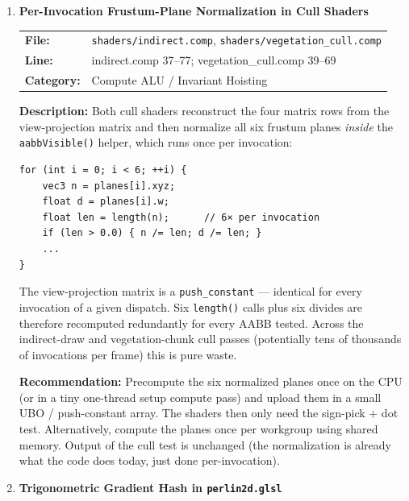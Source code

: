 \documentclass[a4paper,12pt]{article}
\newcommand{\severitybox}[2]{%
  \colorbox{#1}{\makebox[2.5cm][c]{\textcolor{white}{\textbf{#2}}}}%
}
\begin{document}
\begin{enumerate}[leftmargin=*]
\subsection{Medium Severity}

\item[\textbf{[C2]}] \textbf{Per-Invocation Frustum-Plane Normalization in Cull Shaders}
  \hfill \severitybox{mediumcolor}{MEDIUM}

  \begin{tabular}{ll}
    \textbf{File:} & \texttt{shaders/indirect.comp}, \texttt{shaders/vegetation\_cull.comp} \\
    \textbf{Line:} & indirect.comp 37--77; vegetation\_cull.comp 39--69 \\
    \textbf{Category:} & Compute ALU / Invariant Hoisting \\
  \end{tabular}

  \textbf{Description:}
  Both cull shaders reconstruct the four matrix rows from the view-projection
  matrix and then normalize all six frustum planes \emph{inside} the
  \texttt{aabbVisible()} helper, which runs once per invocation:

\begin{lstlisting}
for (int i = 0; i < 6; ++i) {
    vec3 n = planes[i].xyz;
    float d = planes[i].w;
    float len = length(n);      // 6× per invocation
    if (len > 0.0) { n /= len; d /= len; }
    ...
}
\end{lstlisting}

  The view-projection matrix is a \texttt{push\_constant} — identical for every
  invocation of a given dispatch. Six \texttt{length()} calls plus six divides
  are therefore recomputed redundantly for every AABB tested. Across the
  indirect-draw and vegetation-chunk cull passes (potentially tens of thousands
  of invocations per frame) this is pure waste.

  \textbf{Recommendation:}
  Precompute the six normalized planes once on the CPU (or in a tiny one-thread
  setup compute pass) and upload them in a small UBO / push-constant array. The
  shaders then only need the sign-pick + dot test. Alternatively, compute the
  planes once per workgroup using shared memory. Output of the cull test is
  unchanged (the normalization is already what the code does today, just done
  per-invocation).

\item[\textbf{[NL1]}] \textbf{Trigonometric Gradient Hash in \texttt{perlin2d.glsl}}
  \hfill \severitybox{mediumcolor}{MEDIUM}


\end{enumerate}
\end{document}
